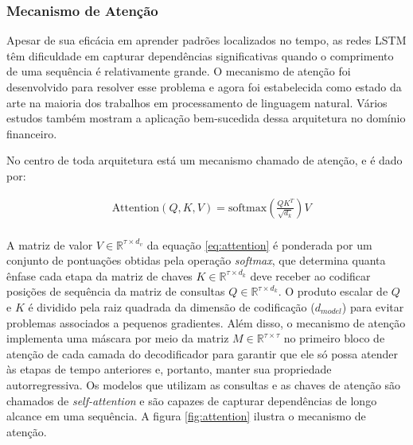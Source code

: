         \subsubsection{Mecanismo de Atenção}
        
            \ipar Apesar de sua eficácia em aprender padrões localizados no tempo, as redes \acrshort{LSTM} têm dificuldade em capturar dependências significativas quando o comprimento de uma sequência é relativamente grande. O mecanismo de atenção foi desenvolvido para resolver esse problema e agora foi estabelecida como estado da arte na maioria dos trabalhos em processamento de linguagem natural. Vários estudos também mostram a aplicação bem-sucedida dessa arquitetura no domínio financeiro.             
            
            \ipar No centro de toda arquitetura está um mecanismo chamado de atenção, e é dado por:

            \begin{equation}
                \label{eq:attention}
                \begin{aligned}
                    & \text{Attention}(Q, K, V) = \text{softmax}\left(\frac{QK^T}{\sqrt{d_k}}\right)V \\
                \end{aligned}
            \end{equation}
        
            \ipar A matriz de valor $V \in \mathbb{R}^{\tau \times d_v}$ da equação \ref{eq:attention} é ponderada por um conjunto de pontuações obtidas pela operação \textit{softmax}, que determina quanta ênfase cada etapa da matriz de chaves $K \in \mathbb{R}^{\tau \times d_k}$ deve receber ao codificar posições de sequência da matriz de consultas $Q \in \mathbb{R}^{\tau \times d_k}$. O produto escalar de $Q$ e $K$ é dividido pela raiz quadrada da dimensão de codificação ($d_{model}$) para evitar problemas associados a pequenos gradientes. Além disso, o mecanismo de atenção implementa uma máscara por meio da matriz $M \in \mathbb{R}^{\tau \times \tau}$ no primeiro bloco de atenção de cada camada do decodificador para garantir que ele só possa atender às etapas de tempo anteriores e, portanto, manter sua propriedade autorregressiva. Os modelos que utilizam as consultas e as chaves de atenção são chamados de \textit{self-attention} e são capazes de capturar dependências de longo alcance em uma sequência. A figura \ref{fig:attention} ilustra o mecanismo de atenção.

